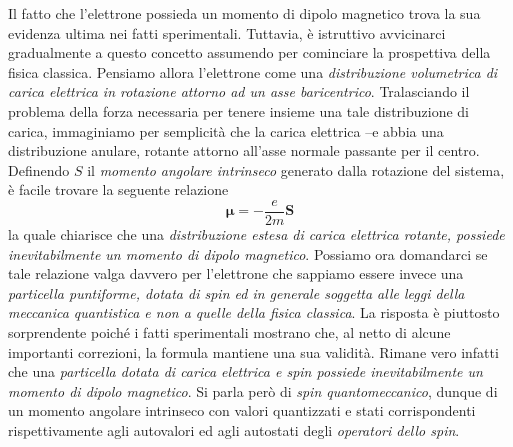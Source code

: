 Il fatto che l’elettrone possieda un momento di dipolo magnetico trova la sua evidenza ultima nei fatti sperimentali. Tuttavia, è istruttivo avvicinarci gradualmente a questo concetto assumendo per cominciare la prospettiva della fisica classica.
Pensiamo allora l’elettrone come una \emph{distribuzione volumetrica di carica elettrica in rotazione attorno ad un asse baricentrico}. Tralasciando il problema della forza necessaria per tenere insieme una tale distribuzione di carica, immaginiamo per semplicità che la carica elettrica –e abbia una distribuzione anulare, rotante attorno all’asse normale passante per il centro.
Definendo $S$ il \emph{momento angolare intrinseco} generato dalla rotazione del sistema, è facile trovare la seguente relazione
\[
\bm{\mu} = - \frac{e}{2m} \bm{S}
\]
la quale chiarisce che una \emph{distribuzione estesa di carica elettrica rotante, possiede inevitabilmente un momento di dipolo magnetico}.
Possiamo ora domandarci se tale relazione valga davvero per l’elettrone che sappiamo essere invece una \emph{particella puntiforme, dotata di spin ed in generale soggetta alle leggi della meccanica quantistica e non a quelle della fisica classica}. La risposta è piuttosto sorprendente poiché i fatti sperimentali mostrano che, al netto di alcune importanti correzioni, la formula mantiene una sua validità. Rimane vero infatti che una \emph{particella dotata di carica elettrica e spin possiede inevitabilmente un momento di dipolo magnetico}. Si parla però di \emph{spin quantomeccanico}, dunque di un momento angolare intrinseco con valori quantizzati e stati corrispondenti rispettivamente agli autovalori ed agli autostati degli \emph{operatori dello spin}.

